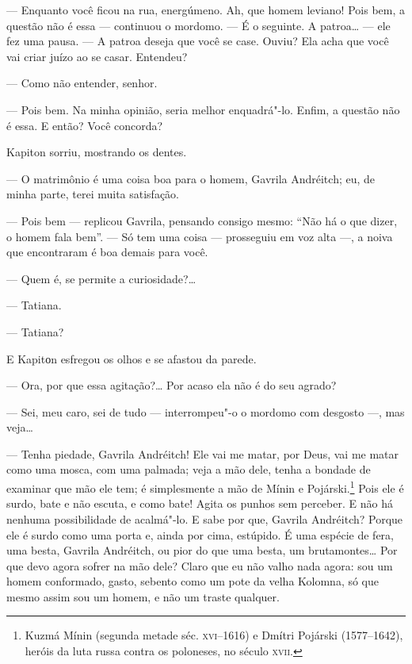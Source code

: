 --- Enquanto você ficou na rua, energúmeno. Ah, que homem leviano! Pois
bem, a questão não é essa --- continuou o mordomo. --- É o seguinte. A
patroa\ldots{} --- ele fez uma pausa. --- A patroa deseja que você se case.
Ouviu? Ela acha que você vai criar juízo ao se casar. Entendeu?

--- Como não entender, senhor.

--- Pois bem. Na minha opinião, seria melhor enquadrá"-lo. Enfim, a
questão não é essa. E então? Você concorda?

Kapiton sorriu, mostrando os dentes.

--- O matrimônio é uma coisa boa para o homem, Gavrila Andréitch; eu, de
minha parte, terei muita satisfação.

--- Pois bem --- replicou Gavrila, pensando consigo mesmo: ``Não há o
que dizer, o homem fala bem''. --- Só tem uma coisa --- prosseguiu em
voz alta ---, a noiva que encontraram é boa demais para você.

--- Quem é, se permite a curiosidade?\ldots{}

--- Tatiana.

--- Tatiana?

E Kapitоn esfregou os olhos e se afastou da parede.

--- Ora, por que essa agitação?\ldots{} Por acaso ela não é do seu agrado?


--- Sei, meu caro, sei de tudo --- interrompeu"-o o mordomo com desgosto
---, mas veja\ldots{}

--- Tenha piedade, Gavrila Andréitch! Ele vai me matar, por Deus, vai me
matar como uma mosca, com uma palmada; veja a mão dele, tenha a bondade
de examinar que mão ele tem; é simplesmente a mão de Mínin e
Pojárski.\footnote{Kuzmá Mínin (segunda metade séc. \textsc{xvi}--1616) e
  Dmítri Pojárski (1577--1642), heróis da luta russa contra os
  poloneses, no século \textsc{xvii}.} Pois ele é surdo, bate e não escuta, e
como bate! Agita os punhos sem perceber. E não há nenhuma possibilidade
de acalmá"-lo. E sabe por que, Gavrila Andréitch? Porque ele é surdo como
uma porta e, ainda por cima, estúpido. É uma espécie de fera, uma besta,
Gavrila Andréitch, ou pior do que uma besta, um brutamontes\ldots{} Por que
devo agora sofrer na mão dele? Claro que eu não valho nada agora: sou um
homem conformado, gasto, sebento como um pote da velha Kolomna, só que
mesmo assim sou um homem, e não um traste qualquer.

